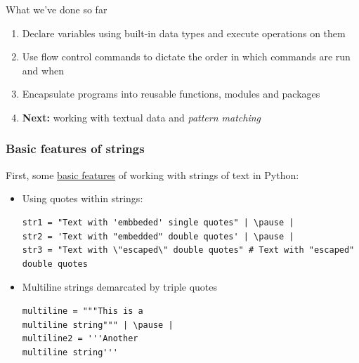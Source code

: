 \documentclass[xcolor=table]{beamer}
\begin{document}
\begin{frame}{What we've done so far}

	\begin{enumerate}\addtolength{\itemsep}{1\baselineskip}
		\item Declare variables using built-in data types and execute operations
		on them
		\item Use flow control commands to dictate the order in which commands are run
		and when
		\item Encapsulate programs into reusable functions, modules and packages
        \item \textbf{Next:} working with textual data and \emph{pattern matching}
	\end{enumerate}

\end{frame}
\begin{frame}[fragile]
    \frametitle{Basic features of strings}
    First, some \href{https://docs.python.org/3/library/stdtypes.html#text-sequence-type-str}{basic features} of working with strings of text in Python:
        \begin{itemize}
            \item Using quotes within strings:
\begin{lstlisting}[style=python]
str1 = "Text with 'embbeded' single quotes" | \pause |
str2 = 'Text with "embedded" double quotes' | \pause |
str3 = "Text with \"escaped\" double quotes" # Text with "escaped" double quotes 
\end{lstlisting}
\pause
            \item Multiline strings demarcated by triple quotes 
                \pause
\begin{lstlisting}[style=python]
multiline = """This is a 
multiline string""" | \pause |
multiline2 = '''Another
multiline string'''
\end{lstlisting}
        \end{itemize}
\end{frame}
\end{document}
